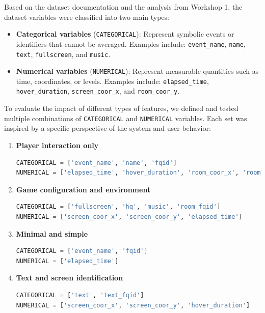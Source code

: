\documentclass[12pt]{article}
\begin{document}
Based on the dataset documentation and the analysis from Workshop 1, the dataset variables were classified into two main types:

\begin{itemize}
    \item \textbf{Categorical variables} (\texttt{CATEGORICAL}): Represent symbolic events or identifiers that cannot be averaged. Examples include: \texttt{event\_name}, \texttt{name}, \texttt{text}, \texttt{fullscreen}, and \texttt{music}.
    
    \item \textbf{Numerical variables} (\texttt{NUMERICAL}): Represent measurable quantities such as time, coordinates, or levels. Examples include: \texttt{elapsed\_time}, \texttt{hover\_duration}, \texttt{screen\_coor\_x}, and \texttt{room\_coor\_y}.
\end{itemize}

To evaluate the impact of different types of features, we defined and tested multiple combinations of \texttt{CATEGORICAL} and \texttt{NUMERICAL} variables. Each set was inspired by a specific perspective of the system and user behavior:

\begin{enumerate}
    \item \textbf{Player interaction only}
    \begin{lstlisting}[language=Python, caption=Feature set based on player interaction, basicstyle=\ttfamily\small]
CATEGORICAL = ['event_name', 'name', 'fqid']
NUMERICAL = ['elapsed_time', 'hover_duration', 'room_coor_x', 'room_coor_y']
    \end{lstlisting}

    \item \textbf{Game configuration and environment}
    \begin{lstlisting}[language=Python, caption=Feature set based on configuration and environment, basicstyle=\ttfamily\small]
CATEGORICAL = ['fullscreen', 'hq', 'music', 'room_fqid']
NUMERICAL = ['screen_coor_x', 'screen_coor_y', 'elapsed_time']
    \end{lstlisting}

    \item \textbf{Minimal and simple}
    \begin{lstlisting}[language=Python, caption=Minimal feature set, basicstyle=\ttfamily\small]
CATEGORICAL = ['event_name', 'fqid']
NUMERICAL = ['elapsed_time']
    \end{lstlisting}

    \item \textbf{Text and screen identification}
    \begin{lstlisting}[language=Python, caption=Feature set based on text and interface identifiers, basicstyle=\ttfamily\small]
CATEGORICAL = ['text', 'text_fqid']
NUMERICAL = ['screen_coor_x', 'screen_coor_y', 'hover_duration']
    \end{lstlisting}
\end{enumerate}
\end{document}
